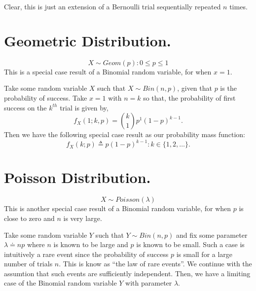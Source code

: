 \documentclass[10pt,a4paper]{article}
\begin{document}
Clear, this is just an extension of a Bernoulli trial sequentially repeated $n$ times.

\section{Geometric Distribution.}
\begin{equation}\label{eqn:geometricdist}
 \boxed{X \sim Geom(p) : 0 \leq p \leq 1}
\end{equation}
This is a special case result of a Binomial random variable, for when $x=1$.

Take some random variable $X$ such that $X \sim Bin(n, p)$, given that $p$ is the probability of success.
Take $x=1$ with $n=k$ so that, the probability of first success on the $k^{th}$ trial is given by,
\[
 f_{X}(1; k, p) = {k \choose 1} p^{1} (1 - p)^{k - 1}.
\]
Then we have the following special case result as our probability mass function:
\begin{equation}\label{eqn:geometric}
 \boxed{f_{X}(k; p) \triangleq p (1 - p)^{k - 1} : k \in \{1, 2, \dots\} .}
\end{equation}

\section{Poisson Distribution.}
\begin{equation}\label{eqn:poissondist}
 \boxed{X \sim Poisson(\lambda)}
\end{equation}
This is another special case result of a Binomial random variable, for when $p$ is close to zero and $n$ is very large\cite{Papoulis-1991}.

Take some random variable $Y$ such that $Y \sim Bin(n, p)$ and fix some parameter $\lambda \doteq n p$ where $n$ is known to be large and $p$ is known to be small.
Such a case is intuitively a rare event since the probability of success $p$ is small for a large number of trials $n$. This is know as ``the law of rare events''\cite{homepages/93/8114}.
We continue with the assumtion that such events are sufficiently independent. Then, we have a limiting case of the Binomial random variable $Y$ with parameter $\lambda$.
\end{document}
